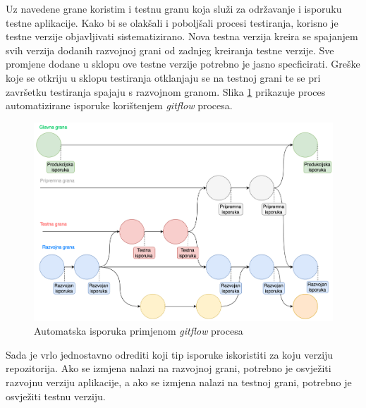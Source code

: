 \documentclass[times, utf8, diplomski, numeric]{fer}
\begin{document}
Uz navedene grane koristim i testnu granu koja služi za održavanje i isporuku testne aplikacije. Kako bi se olakšali i poboljšali procesi testiranja, korisno je testne verzije objavljivati sistematizirano. Nova testna verzija kreira se spajanjem svih verzija dodanih razvojnoj grani od zadnjeg kreiranja testne verzije. Sve promjene dodane u sklopu ove testne verzije potrebno je jasno specficirati. Greške koje se otkriju u sklopu testiranja otklanjaju se na testnoj grani te se pri završetku testiranja spajaju s razvojnom granom. Slika \ref{fig:GitFlowCD} prikazuje proces automatizirane isporuke korištenjem \textit{gitflow} procesa.

\begin{figure}[t!]
\centering
\includegraphics[scale=0.5]{GitFlowCD}
\caption{Automatska isporuka primjenom \textit{gitflow} procesa}
\label{fig:GitFlowCD}
\end{figure}

Sada je vrlo jednostavno odrediti koji tip isporuke iskoristiti za koju verziju repozitorija. Ako se izmjena nalazi na razvojnoj grani, potrebno je osvježiti razvojnu verziju aplikacije, a ako se izmjena nalazi na testnoj grani, potrebno je osvježiti testnu verziju.
\end{document}
